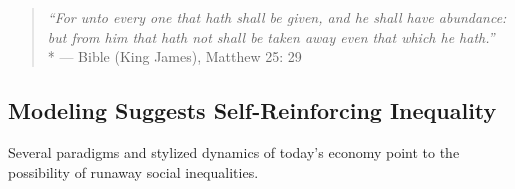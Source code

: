 \begin{quote}
	\emph{``For unto every one that hath shall be given, and he shall have abundance: but from him that hath not shall be taken away even that which he hath.''}\\*
	--- Bible (King James), Matthew 25: 29
\end{quote}





\subsection[Models of Inequality]{Modeling Suggests Self-Reinforcing Inequality}
Several paradigms and stylized dynamics of today's economy point to the possibility of runaway social inequalities.





